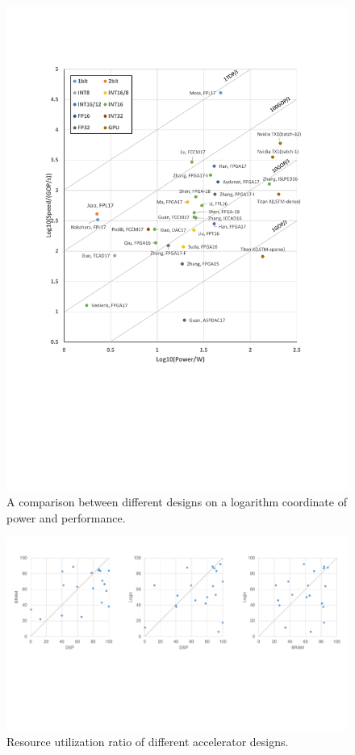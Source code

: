 \begin{figure}[ht]
    \centering
    \includegraphics[width=1.0\columnwidth]{fig/efficiency.pdf}
    \caption{A comparison between different designs on a logarithm coordinate of power and performance. }
    \label{fig:efficiency}
\end{figure}

\begin{figure}[ht]
    \centering
    \includegraphics[width=1.0\columnwidth]{fig/resource.pdf}
    \caption{Resource utilization ratio of different accelerator designs.}
    \label{fig:resource}
\end{figure}

